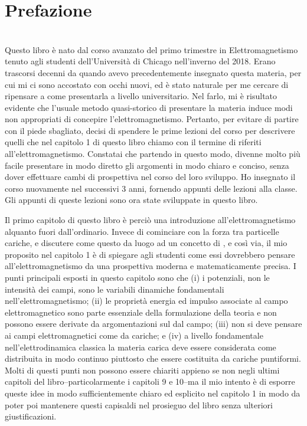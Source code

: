 \chapter*{Prefazione}\label{Wald_EM_00}
\\

Questo libro è nato dal corso avanzato del primo trimestre in Elettromagnetismo tenuto agli studenti dell'Università di Chicago nell'inverno del 2018. Erano trascorsi decenni da quando avevo precedentemente insegnato questa materia, per cui mi ci sono accostato con occhi nuovi, ed è stato naturale per me cercare di ripensare a come presentarla a livello universitario. Nel farlo, mi è risultato evidente che l'usuale metodo quasi-storico di presentare la materia induce modi non appropriati di concepire l'elettromagnetismo. Pertanto, per evitare di partire con il piede sbagliato, decisi di spendere le prime lezioni del corso per descrivere quelli che nel capitolo 1 di questo libro chiamo con il termine di  riferiti all'elettromagnetismo. Constatai che partendo in questo modo,  divenne molto più facile presentare in modo diretto gli argomenti in modo chiaro e conciso, senza dover effettuare cambi di prospettiva nel  corso del loro sviluppo. Ho insegnato il corso nuovamente nel successivi 3 anni, fornendo appunti delle lezioni alla classe. Gli appunti di queste lezioni sono ora state sviluppate in questo libro.

Il primo capitolo di questo libro è perciò una introduzione all'elettromagnetismo alquanto fuori dall'ordinario. Invece di cominciare con la forza tra particelle cariche, e discutere come questo da luogo ad un concetto di , e così via, il mio proposito nel capitolo 1 è di spiegare agli studenti come essi dovrebbero pensare all'elettromagnetismo da una prospettiva moderna e matematicamente precisa. I punti principali esposti in questo capitolo sono che (i) i potenziali, non le intensità dei campi, sono le variabili dinamiche fondamentali nell'elettromagnetismo; (ii) le proprietà energia ed impulso associate al campo elettromagnetico sono parte essenziale della formulazione della teoria e non possono essere derivate da argomentazioni sul  dal campo; (iii) non si deve pensare ai campi elettromagnetici come  da cariche; e (iv) a livello fondamentale nell'elettrodinamica classica la materia carica deve essere considerata come distribuita in modo continuo piuttosto che essere costituita da cariche puntiformi. Molti di questi punti non possono essere chiariti appieno se non negli ultimi capitoli del libro--particolarmente i capitoli 9 e 10--ma il mio intento è di esporre queste idee in modo sufficientemente chiaro ed esplicito nel capitolo 1 in modo da poter poi mantenere questi capisaldi nel prosieguo del libro senza ulteriori giustificazioni. 

